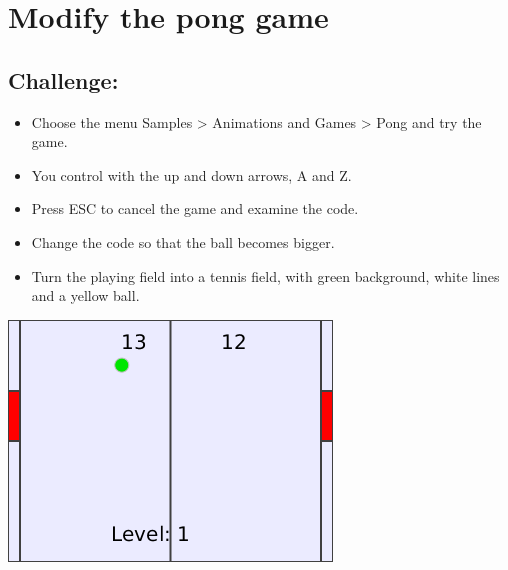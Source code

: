 \chapter{Modify the pong game}
\begin{multicols}{2}
\section*{\color{BrickRed}Challenge:}


\begin{itemize}

\item {Choose the menu Samples > Animations and Games > Pong and try the game.}
\item {You control with the up and down arrows,  A and Z.}
\item {Press ESC to cancel the game and examine the code.}
\item {Change the code so that the ball becomes bigger.}
\item {Turn the playing field into a tennis field, with green background, white lines and a yellow ball.}

\end{itemize}



\columnbreak

\begin{center}
\includegraphics{../img/pong.png}
\end{center}

\end{multicols}

